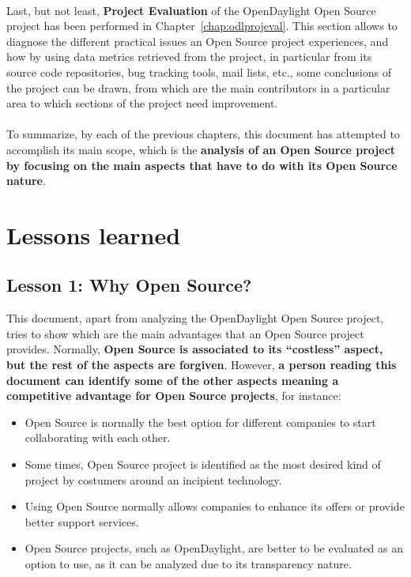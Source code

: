 \documentclass[a4paper, 12pt]{book}
\begin{document}
\\
Last, but not least, \textbf{Project Evaluation} of the OpenDaylight Open Source project has been performed in Chapter~\ref{chap:odlprojeval}. This section allows to diagnose the different practical issues an Open Source project experiences, and how by using data metrics retrieved from the project, in particular from its source code repositories, bug tracking tools, mail lists, etc., some conclusions of the project can be drawn, from which are the main contributors in a particular area to which sections of the project need improvement.\\
\\
To summarize, by each of the previous chapters, this document has attempted to accomplish its main scope, which is the \textbf{analysis of an Open Source project by focusing on the main aspects that have to do with its Open Source nature}.

\section{Lessons learned}
\label{sec:lessons}

\subsection{Lesson 1: Why Open Source?}
This document, apart from analyzing the OpenDaylight Open Source project, tries to show which are the main advantages that an Open Source project provides. Normally, \textbf{Open Source is associated to its ``costless'' aspect, but the rest of the aspects are forgiven}. However, \textbf{a person reading this document can identify some of the other aspects meaning a competitive advantage for Open Source projects}, for instance:
\begin{itemize}
 \item{Open Source is normally the best option for different companies to start collaborating with each other}.
 \item{Some times, Open Source project is identified as the most desired kind of project by costumers around an incipient technology}.
 \item{Using Open Source normally allows companies to enhance its offers or provide better support services}.
 \item{Open Source projects, such as OpenDaylight, are better to be evaluated as an option to use, as it can be analyzed due to its transparency nature}.
\end{itemize}
\end{document}
